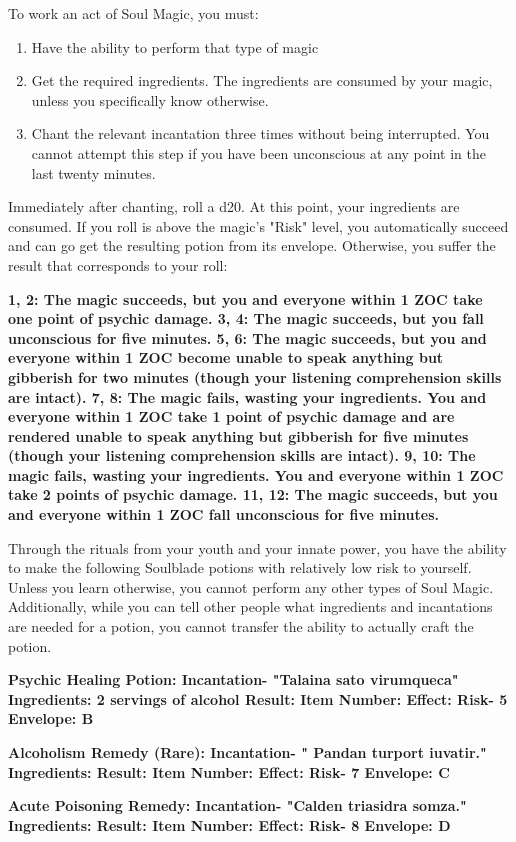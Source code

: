 \documentclass[green]{Kos}
\begin{document}
\name{\gButlerSoulMagic{}}


To work an act of Soul Magic, you must:

\begin{enumerate} 
\item Have the ability to perform that type of magic
\item Get the required ingredients. The ingredients are consumed by your magic, unless you specifically know otherwise.
\item Chant the relevant incantation three times without being interrupted. You cannot attempt this step if you have been unconscious at any point in the last twenty minutes.
\end{enumerate}

Immediately after chanting, roll a d20. At this point, your ingredients are consumed. If you roll is above the magic's "Risk" level, you automatically succeed and can go get the resulting potion from its envelope. Otherwise, you suffer the result that corresponds to your roll:

\bf{1, 2:} The magic succeeds, but you and everyone within 1 ZOC take one point of psychic damage.
\bf{3, 4:} The magic succeeds, but you fall unconscious for five minutes.
\bf{5, 6:} The magic succeeds, but you and everyone within 1 ZOC become unable to speak anything but gibberish for two minutes (though your listening comprehension skills are intact).
\bf{7, 8:} The magic fails, wasting your ingredients.  You and everyone within 1 ZOC take 1 point of psychic damage and are rendered unable to speak anything but gibberish for five minutes (though your listening comprehension skills are intact).
\bf{9, 10:} The magic fails, wasting your ingredients. You and everyone within 1 ZOC take 2 points of psychic damage.
\bf{11, 12:} The magic succeeds, but you and everyone within 1 ZOC fall unconscious for five minutes.

Through the rituals from your youth and your innate power, you have the ability to make the following Soulblade potions with relatively low risk to yourself. Unless you learn otherwise, you cannot perform any other types of Soul Magic. Additionally, while you can tell other people what ingredients and incantations are needed for a potion, you cannot transfer the ability to actually craft the potion.

\bf{Psychic Healing Potion:}
Incantation- "Talaina sato virumqueca"
Ingredients: 2 servings of alcohol
Result: \iPsychicHealthRemedy{\MYname}
Item Number: \iPsychicHealthRemedy{\MYnumber}
Effect: \iPsychicHealthRemedy{\MYtext}
Risk- 5
Envelope: B

\bf{Alcoholism Remedy (Rare):}
Incantation- " Pandan turport iuvatir."
Ingredients: \iSugar{\MYname}
Result: \iAlcoholismRemedy{\MYname}
Item Number: \iAlcoholismRemedy{\MYnumber}
Effect: \iAlcoholismRemedy{\MYtext}
Risk- 7
Envelope: C

\bf{Acute Poisoning Remedy:}
Incantation- "Calden triasidra somza."
Ingredients: \iHerbs{\MYname}
Result: \iAcutePoisonRemedy{\MYname}
Item Number: \iAcutePoisonRemedy{\MYnumber}
Effect: \iAcutePoisonRemedy{\MYtext}
Risk- 8
Envelope: D
\end{document}
